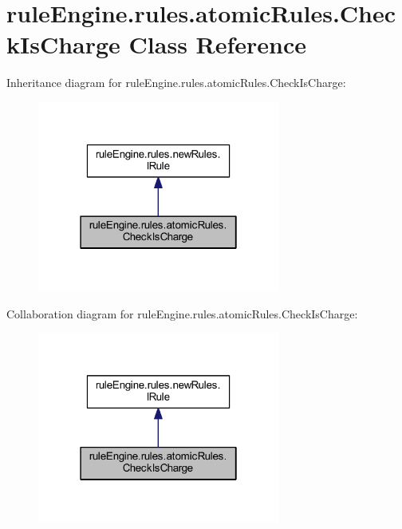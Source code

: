 \hypertarget{classrule_engine_1_1rules_1_1atomic_rules_1_1_check_is_charge}{}\section{rule\+Engine.\+rules.\+atomic\+Rules.\+Check\+Is\+Charge Class Reference}
\label{classrule_engine_1_1rules_1_1atomic_rules_1_1_check_is_charge}


Inheritance diagram for rule\+Engine.\+rules.\+atomic\+Rules.\+Check\+Is\+Charge\+:
\nopagebreak
\begin{figure}[H]
\begin{center}
\leavevmode
\includegraphics[width=226pt]{classrule_engine_1_1rules_1_1atomic_rules_1_1_check_is_charge__inherit__graph}
\end{center}
\end{figure}


Collaboration diagram for rule\+Engine.\+rules.\+atomic\+Rules.\+Check\+Is\+Charge\+:
\nopagebreak
\begin{figure}[H]
\begin{center}
\leavevmode
\includegraphics[width=226pt]{classrule_engine_1_1rules_1_1atomic_rules_1_1_check_is_charge__coll__graph}
\end{center}
\end{figure}
